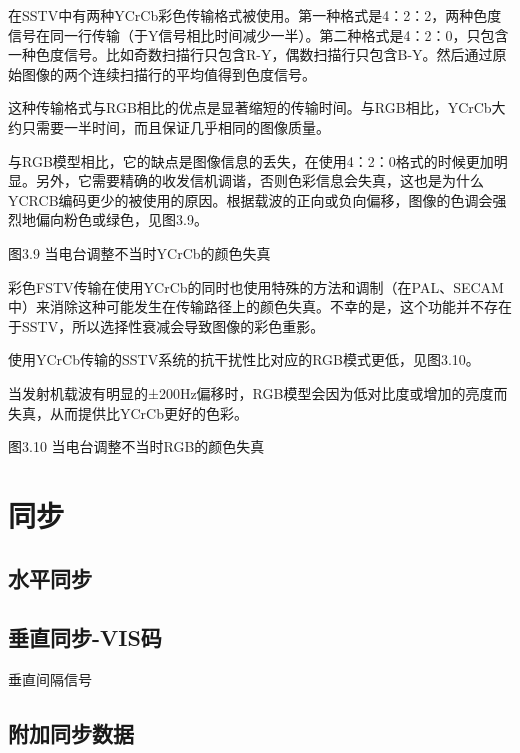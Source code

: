 在SSTV中有两种YCrCb彩色传输格式被使用。第一种格式是4：2：2，两种色度信号在同一行传输（于Y信号相比时间减少一半）。第二种格式是4：2：0，只包含一种色度信号。比如奇数扫描行只包含R-Y，偶数扫描行只包含B-Y。然后通过原始图像的两个连续扫描行的平均值得到色度信号。

这种传输格式与RGB相比的优点是显著缩短的传输时间。与RGB相比，YCrCb大约只需要一半时间，而且保证几乎相同的图像质量。

与RGB模型相比，它的缺点是图像信息的丢失，在使用4：2：0格式的时候更加明显。另外，它需要精确的收发信机调谐，否则色彩信息会失真，这也是为什么YCRCB编码更少的被使用的原因。根据载波的正向或负向偏移，图像的色调会强烈地偏向粉色或绿色，见图3.9。

图3.9 当电台调整不当时YCrCb的颜色失真

彩色FSTV传输在使用YCrCb的同时也使用特殊的方法和调制（在PAL、SECAM中）来消除这种可能发生在传输路径上的颜色失真。不幸的是，这个功能并不存在于SSTV，所以选择性衰减会导致图像的彩色重影。

使用YCrCb传输的SSTV系统的抗干扰性比对应的RGB模式更低，见图3.10。

当发射机载波有明显的±200Hz偏移时，RGB模型会因为低对比度或增加的亮度而失真，从而提供比YCrCb更好的色彩。

图3.10 当电台调整不当时RGB的颜色失真

\section{同步}

\subsection{水平同步}

\subsection{垂直同步-VIS码}
垂直间隔信号

\subsection{附加同步数据}